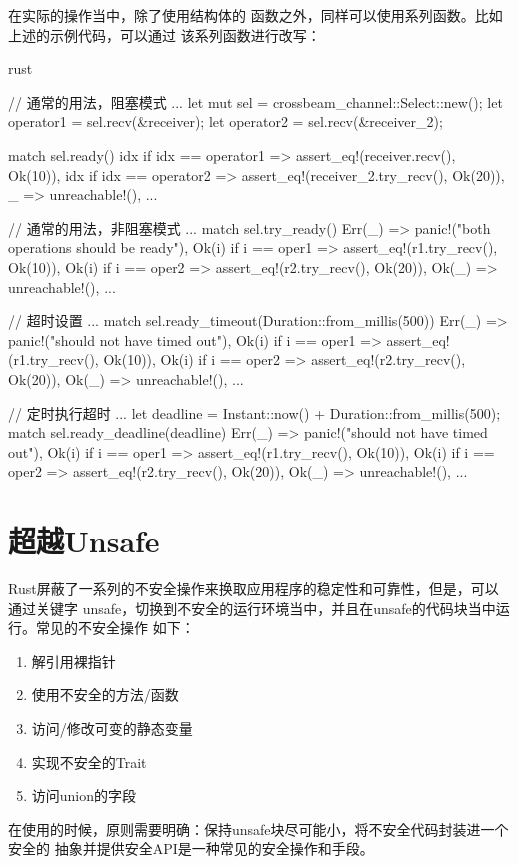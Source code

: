 在实际的操作当中，除了使用结构体的
函数之外，同样可以使用系列函数。比如上述的示例代码，可以通过
该系列函数进行改写：
\begin{code-block}{rust}

// 通常的用法，阻塞模式
...
let mut sel = crossbeam_channel::Select::new();
let operator1 = sel.recv(&receiver);
let operator2 = sel.recv(&receiver_2);

match sel.ready() {
    idx if idx == operator1 => assert_eq!(receiver.recv(), Ok(10)),
    idx if idx == operator2 => assert_eq!(receiver_2.try_recv(), Ok(20)),
    _ => unreachable!(),
}
...

// 通常的用法，非阻塞模式
...
match sel.try_ready() {
    Err(_) => panic!("both operations should be ready"),
    Ok(i) if i == oper1 => assert_eq!(r1.try_recv(), Ok(10)),
    Ok(i) if i == oper2 => assert_eq!(r2.try_recv(), Ok(20)),
    Ok(_) => unreachable!(),
}
...

// 超时设置
...
match sel.ready_timeout(Duration::from_millis(500)) {
    Err(_) => panic!("should not have timed out"),
    Ok(i) if i == oper1 => assert_eq!(r1.try_recv(), Ok(10)),
    Ok(i) if i == oper2 => assert_eq!(r2.try_recv(), Ok(20)),
    Ok(_) => unreachable!(),
}
...

// 定时执行超时
...
let deadline = Instant::now() + Duration::from_millis(500);
match sel.ready_deadline(deadline) {
    Err(_) => panic!("should not have timed out"),
    Ok(i) if i == oper1 => assert_eq!(r1.try_recv(), Ok(10)),
    Ok(i) if i == oper2 => assert_eq!(r2.try_recv(), Ok(20)),
    Ok(_) => unreachable!(),
}
...
\end{code-block}

\section{超越Unsafe}
Rust屏蔽了一系列的不安全操作来换取应用程序的稳定性和可靠性，但是，可以通过关键字
unsafe，切换到不安全的运行环境当中，并且在unsafe的代码块当中运行。常见的不安全操作
如下：
\begin{enumerate}
  \item 解引用裸指针
  \item 使用不安全的方法/函数
  \item 访问/修改可变的静态变量
  \item 实现不安全的Trait
  \item 访问union的字段
\end{enumerate}
在使用的时候，原则需要明确：保持unsafe块尽可能小，将不安全代码封装进一个安全的
抽象并提供安全API是一种常见的安全操作和手段。

